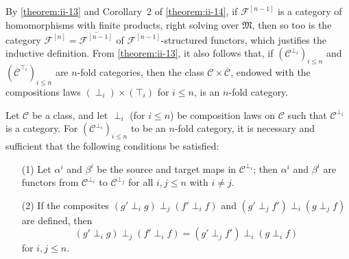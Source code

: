 \documentclass[a4paper,fleqn]{article}
\theoremstyle{plain}
\newenvironment{theorem}[1]
  {\renewcommand\theinnertheorem{#1}\innertheorem}
  {\endinnertheorem}
\theoremstyle{definition}
\renewcommand{\leq}{\leqslant}
\newcommand{\CC}{\mathcal{C}}
\newcommand{\MM}{\mathfrak{M}}
\newcommand{\FF}{\mathcal{F}}
\begin{document}
By \cref{theorem:ii-13} and Corollary~2 of \cref{theorem:ii-14}, if $\FF^{[n-1]}$ is a category of homomorphisms with finite products, right solving over $\MM$, then so too is the category $\FF^{[n]}=\overline{\FF^{[n-1]}}$ of $\FF^{[n-1]}$-structured functors, which justifies the inductive definition.
From \cref{theorem:ii-13}, it also follows that, if $(\CC^{\perp_i})_{i\leq n}$ and $(\overline{\CC}^{\top_i})_{i\leq n}$ are $n$-fold categories, then the class $\CC\times\overline{\CC}$, endowed with the compositions laws $(\perp_i)\times(\top_i)$ for $i\leq n$, is an $n$-fold category.

\begin{theorem}{8}
\label{theorem:ii-8}
  Let $\CC$ be a class, and let $\perp_i$ (for $i\leq n$) be composition laws on $\CC$ such that $\CC^{\perp_i}$ is a category.
  For $(\CC^{\perp_i})_{i\leq n}$ to be an $n$-fold category, it is necessary and sufficient that the following conditions be satisfied:
  \begin{enumerate}
    \item[\normalfont(1)]
      Let $\alpha^i$ and $\beta^i$ be the source and target maps in $\CC^{\perp_i}$;
      then $\alpha^i$ and $\beta^i$ are functors from $\CC^{\perp_i}$ to $\CC^{\perp_j}$ for all $i,j\leq n$ with $i\neq j$.

    \item[\normalfont(2)]
      If the composites $(g'\perp_i g)\perp_j(f'\perp_i f)$ and $(g'\perp_j f')\perp_i(g\perp_j f)$ are defined, then
      \[
        (g'\perp_i g)\perp_j(f'\perp_i f)
        = (g'\perp_j f')\perp_i(g\perp_i f)
      \]
      for $i,j\leq n$.
  \end{enumerate}
\end{theorem}
\end{document}
